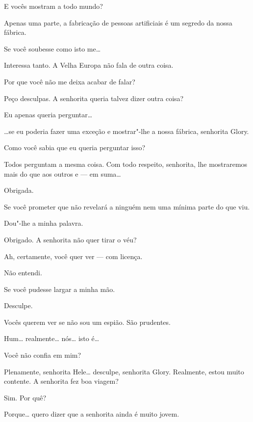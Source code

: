  E vocês mostram a todo mundo?

 Apenas uma parte, a fabricação de pessoas artificiais é um segredo da
nossa fábrica.

 Se você soubesse como isto me\ldots{}

 Interessa tanto. A Velha Europa não fala de outra coisa.

 Por que você não me deixa acabar de falar?

 Peço desculpas. A senhorita queria talvez dizer outra coisa?

 Eu apenas queria perguntar\ldots{}

 \ldots{}se eu poderia fazer uma exceção e mostrar"-lhe a nossa fábrica,
senhorita Glory.

 Como você sabia que eu queria perguntar isso?

 Todos perguntam a mesma coisa.  Com todo respeito,
senhorita, lhe mostraremos mais do que aos outros e --- em suma\ldots{}

 Obrigada.

 Se você prometer que não revelará a ninguém nem uma mínima parte do que
viu.

  Dou"-lhe a minha palavra.

 Obrigado. A senhorita não quer tirar o véu?

 Ah, certamente, você quer ver --- com licença.

 Não entendi.

 Se você pudesse largar a minha mão.

  Desculpe.

  Vocês querem ver se não sou um espião. São
prudentes.

  Hum\ldots{} realmente\ldots{} nós\ldots{} isto é\ldots{}

 Você não confia em mim?

 Plenamente, senhorita Hele\ldots{} desculpe, senhorita Glory. Realmente, estou
muito contente. A senhorita fez boa viagem?

 Sim. Por quê?

 Porque\ldots{} quero dizer que a senhorita ainda é muito jovem.

